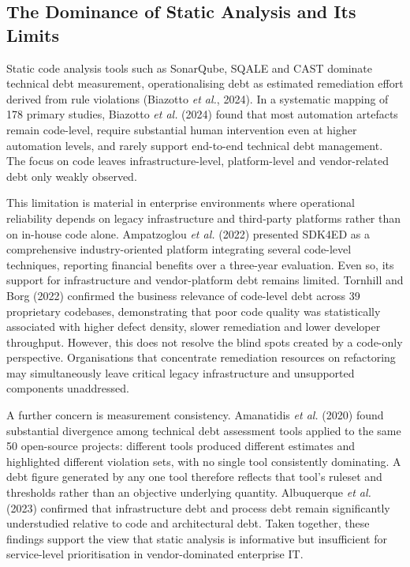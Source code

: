 \documentclass[
  12pt,
  letterpaper,
  12pt,
  oneside,
  english,
  onehalfspacing,
  headsepline]{MastersDoctoralThesis}
\begin{document}
\subsection{The Dominance of Static Analysis and Its
Limits}\label{the-dominance-of-static-analysis-and-its-limits}

Static code analysis tools such as SonarQube, SQALE and CAST dominate
technical debt measurement, operationalising debt as estimated
remediation effort derived from rule violations (Biazotto \emph{et al.},
2024). In a systematic mapping of 178 primary studies, Biazotto \emph{et
al.} (2024) found that most automation artefacts remain code-level,
require substantial human intervention even at higher automation levels,
and rarely support end-to-end technical debt management. The focus on
code leaves infrastructure-level, platform-level and vendor-related debt
only weakly observed.

This limitation is material in enterprise environments where operational
reliability depends on legacy infrastructure and third-party platforms
rather than on in-house code alone. Ampatzoglou \emph{et al.} (2022)
presented SDK4ED as a comprehensive industry-oriented platform
integrating several code-level techniques, reporting financial benefits
over a three-year evaluation. Even so, its support for infrastructure
and vendor-platform debt remains limited. Tornhill and Borg (2022)
confirmed the business relevance of code-level debt across 39
proprietary codebases, demonstrating that poor code quality was
statistically associated with higher defect density, slower remediation
and lower developer throughput. However, this does not resolve the blind
spots created by a code-only perspective. Organisations that concentrate
remediation resources on refactoring may simultaneously leave critical
legacy infrastructure and unsupported components unaddressed.

A further concern is measurement consistency. Amanatidis \emph{et al.}
(2020) found substantial divergence among technical debt assessment
tools applied to the same 50 open-source projects: different tools
produced different estimates and highlighted different violation sets,
with no single tool consistently dominating. A debt figure generated by
any one tool therefore reflects that tool's ruleset and thresholds
rather than an objective underlying quantity. Albuquerque \emph{et al.}
(2023) confirmed that infrastructure debt and process debt remain
significantly understudied relative to code and architectural debt.
Taken together, these findings support the view that static analysis is
informative but insufficient for service-level prioritisation in
vendor-dominated enterprise IT.
\end{document}
